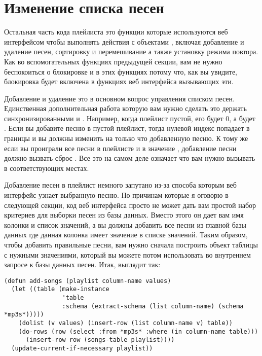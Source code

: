 \section{Изменение списка песен}

Остальная часть кода плейлиста это функции которые используются веб интерфейсом чтобы
выполнять действия с объектами , включая добавление и удаление песен,
сортировку и перемешивание а также установку режима повтора. Как во вспомогательных
функциях предыдущей секции, вам не нужно беспокоиться о блокировке и в этих функциях
потому что, как вы увидите, блокировка будет включена в функциях веб интерфейса вызывающих
эти.

Добавление и удаление это в основном вопрос управления списком песен. Единственная
дополнительная работа которую вам нужно сделать это держать синхронизированными
 и . Например, когда плейлист пустой, его
 будет 0, а  будет . Если
вы добавите песню в пустой плейлист, тогда нулевой индекс попадает в границы и вы должны
изменить  на только что добавленную песню. К тому же если вы проиграли все
песни в плейлисте и в  значение ,
добавление песни должно вызвать сброс . Все это на самом деле означает что
вам нужно вызывать в соответствующих местах. 

Добавление песен в плейлист немного запутано из-за способа которым веб интерфейс узнает
выбранную песню. По причинам которые я оговорю в следующей секции, код веб интерфейса просто
не может дать вам простой набор критериев для выборки песен из базы данных. Вместо этого он дает
вам имя колонки и список значений, а вы должны добавить все песни из главной базы данных
где данная колонка имеет значение в списке значений. Таким образом, чтобы добавить
правильные песни, вам нужно сначала построить объект таблицы с нужными значениями, который
вы можете потом использовать во внутреннем запросе к базы данных песен. Итак,
 выглядит так:

\begin{lstlisting}
(defun add-songs (playlist column-name values)
  (let ((table (make-instance
                'table 
                :schema (extract-schema (list column-name) (schema *mp3s*)))))
    (dolist (v values) (insert-row (list column-name v) table))
    (do-rows (row (select :from *mp3s* :where (in column-name table)))
      (insert-row row (songs-table playlist))))
  (update-current-if-necessary playlist))
\end{lstlisting}

